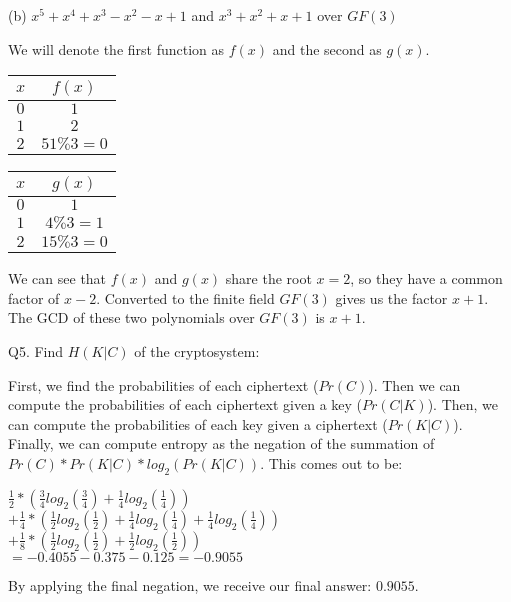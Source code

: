 \documentclass[11pt]{article}
\newcommand{\gap}{\vspace{3mm}}
\newcommand{\bigGap}{\vspace{10mm}}
\begin{document}
\gap{}

(b) $x^5 + x^4 + x^3 - x^2 - x + 1$ and $x^3+x^2+x+1$ over $GF(3)$

\gap{}

We will denote the first function as $f(x)$ and the second as $g(x)$.
\begin{center}
\begin{tabular}{ |c|c| }
\hline
$x$ & $f(x)$\\
\hline
$0$ & $1$\\
$1$ & $2$\\
$2$ & $51\%3=0$\\
\hline
\end{tabular}
\begin{tabular}{ |c|c| }
\hline
$x$ & $g(x)$\\
\hline
$0$ & $1$\\
$1$ & $4\%3=1$\\
$2$ & $15\%3=0$\\
\hline
\end{tabular}
\end{center}
We can see that $f(x)$ and $g(x)$ share the root $x=2$, so they have a common factor of $x-2$. Converted to the finite field $GF(3)$ gives us the factor $x+1$. The GCD of these two polynomials over $GF(3)$ is $x+1$.

\bigGap{}

Q5. Find $H(K|C)$ of the cryptosystem:\\

\gap{}

First, we find the probabilities of each ciphertext ($Pr(C)$). Then we can compute the probabilities of each ciphertext given a key ($Pr(C|K)$). Then, we can compute the probabilities of each key given a ciphertext ($Pr(K|C)$). Finally, we can compute entropy as the negation of the summation of $Pr(C) * Pr(K|C) * log_2(Pr(K|C))$. This comes out to be:\\
\begin{center}
$\frac{1}{2} * (\frac{3}{4}log_2(\frac{3}{4}) + \frac{1}{4}log_2(\frac{1}{4}))$\\
$+ \frac{1}{4} * (\frac{1}{2}log_2(\frac{1}{2}) + \frac{1}{4}log_2(\frac{1}{4}) + \frac{1}{4}log_2(\frac{1}{4}))$\\
$+ \frac{1}{8} * (\frac{1}{2}log_2(\frac{1}{2}) + \frac{1}{2}log_2(\frac{1}{2}))$\\
$=-0.4055-0.375-0.125=-0.9055$
\end{center}

By applying the final negation, we receive our final answer: $0.9055$.
\end{document}

